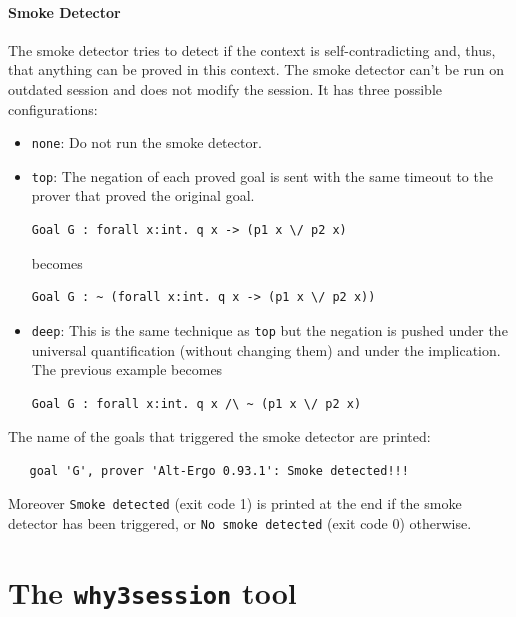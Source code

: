 \paragraph{Smoke Detector}

The smoke detector tries to detect if the context is self-contradicting
 and, thus, that anything can be proved in this context. The smoke
 detector can't be run on outdated session and does not modify the session.
 It has three possible configurations:
 \begin{itemize}
\item \texttt{none}: Do not run the smoke detector.
\item \texttt{top}: The negation of each proved goal is sent with the
same timeout to the prover that proved the original goal.
\begin{verbatim}
Goal G : forall x:int. q x -> (p1 x \/ p2 x)
\end{verbatim}
becomes
\begin{verbatim}
Goal G : ~ (forall x:int. q x -> (p1 x \/ p2 x))
\end{verbatim}
\item \texttt{deep}: This is the same technique as \texttt{top} but the
   negation is pushed under the universal quantification (without
   changing them) and under the implication. The previous example becomes
\begin{verbatim}
Goal G : forall x:int. q x /\ ~ (p1 x \/ p2 x)
\end{verbatim}
 \end{itemize}

\noindent
The name of the goals that triggered the smoke detector are printed:
\begin{verbatim}
   goal 'G', prover 'Alt-Ergo 0.93.1': Smoke detected!!!
\end{verbatim}
Moreover \texttt{Smoke detected} (exit code 1) is printed at the end if the smoke
detector has been triggered, or \texttt{No smoke detected} (exit code 0)
otherwise.



\section{The \texttt{why3session} tool}
\label{sec:why3session}

